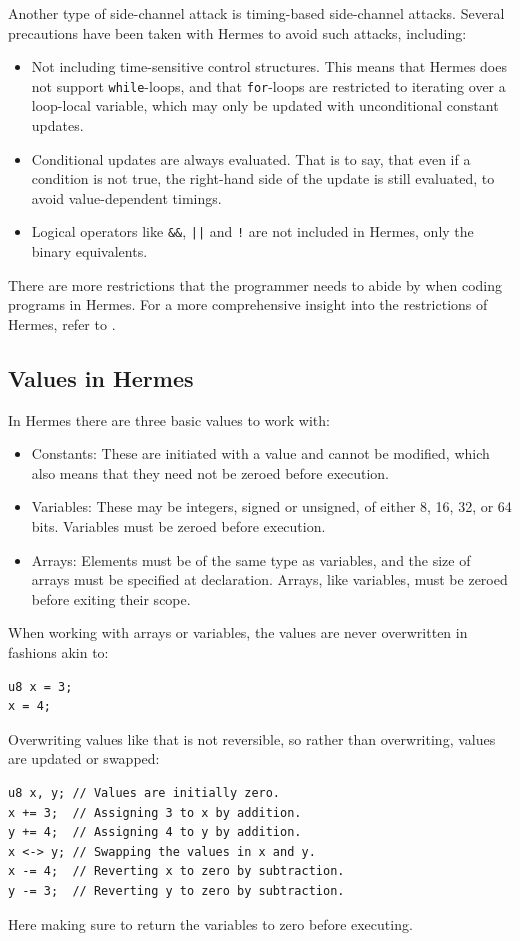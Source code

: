 Another type of side-channel attack is timing-based side-channel attacks. Several precautions have been taken with Hermes to avoid such attacks, including:
\begin{itemize}
\item Not including time-sensitive control structures. This means that Hermes does not support \texttt{while}-loops, and that \texttt{for}-loops are restricted to iterating over a loop-local variable, which may only be updated with unconditional constant updates. 
\item Conditional updates are always evaluated. That is to say, that even if a condition is not true, the right-hand side of the update is still evaluated, to avoid value-dependent timings.
\item Logical operators like \texttt{\&\&}, \texttt{||} and \texttt{!} are not included in Hermes, only the binary equivalents.
\end{itemize}
There are more restrictions that the programmer needs to abide by when coding programs in Hermes. For a more comprehensive insight into the restrictions of Hermes, refer to \cite{PSI19}.

\subsection{Values in Hermes}
In Hermes there are three basic values to work with:
\begin{itemize}
\item Constants: These are initiated with a value and cannot be modified, which also means that they need not be zeroed before execution.
\item Variables: These may be integers, signed or unsigned, of either 8, 16, 32, or 64 bits. Variables must be zeroed before execution. 
\item Arrays: Elements must be of the same type as variables, and the size of arrays must be specified at declaration. Arrays, like variables, must be zeroed before exiting their scope. 
\end{itemize}
When working with arrays or variables, the values are never overwritten in fashions akin to:
\begin{verbatim}
u8 x = 3;
x = 4;
\end{verbatim}
Overwriting values like that is not reversible, so rather than overwriting, values are updated or swapped:
\begin{verbatim}
u8 x, y; // Values are initially zero.
x += 3;  // Assigning 3 to x by addition. 
y += 4;  // Assigning 4 to y by addition.
x <-> y; // Swapping the values in x and y. 
x -= 4;  // Reverting x to zero by subtraction. 
y -= 3;  // Reverting y to zero by subtraction.
\end{verbatim}
Here making sure to return the variables to zero before executing. 

